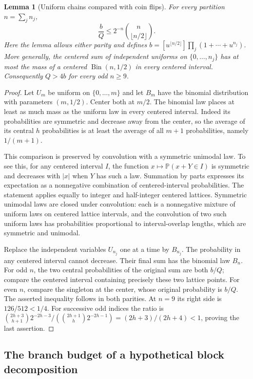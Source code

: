 \documentclass[11pt,a4paper]{article}
\newtheorem{lemma}[theorem]{Lemma}
\theoremstyle{definition}
\theoremstyle{remark}
\numberwithin{equation}{section}
\begin{document}
\begin{lemma}[Uniform chains compared with coin flips]\label{p7:gn:concentration}
For every partition $n=\sum_j n_j$,
\[
 \frac bQ\le 2^{-n}\binom n{\lfloor n/2\rfloor}.
\]
Here the lemma allows either parity and defines
$b=[u^{\lfloor n/2\rfloor}]\prod_j(1+\cdots+u^{n_j})$.
More generally, the centered sum of independent uniforms on
$\{0,\ldots,n_j\}$ has at most the mass of a centered
$\operatorname{Bin}(n,1/2)$ in every centered interval.
Consequently $Q>4b$ for every odd $n\ge9$.
\end{lemma}
\begin{proof}
Let $U_m$ be uniform on $\{0,\ldots,m\}$ and let $B_m$ have
the binomial distribution with parameters $(m,1/2)$. Center both
at $m/2$. The binomial law places at least as much mass as the
uniform law in every centered interval. Indeed its probabilities
are symmetric and decrease away from the center, so the average
of its central $h$ probabilities is at least the average of all
$m+1$ probabilities, namely $1/(m+1)$.

This comparison is preserved by convolution with a symmetric
unimodal law. To see this, for any centered interval $I$, the
function $x\mapsto\mathbb P(x+Y\in I)$ is symmetric and decreases
with $|x|$ when $Y$ has such a law. Summation by parts expresses
its expectation as a nonnegative combination of centered-interval
probabilities. The statement applies equally to integer and
half-integer centered lattices. Symmetric unimodal laws are closed
under convolution: each is a nonnegative mixture of uniform laws
on centered lattice intervals, and the convolution of two such
uniform laws has probabilities proportional to interval-overlap
lengths, which are symmetric and unimodal.

Replace the independent variables $U_{n_j}$ one at a time by
$B_{n_j}$. The probability in any centered interval cannot decrease.
Their final sum has the binomial law $B_n$. For odd $n$, the two
central probabilities of the original sum are both $b/Q$; compare
the centered interval containing precisely these two lattice points.
For even $n$, compare the singleton at the center, whose original
probability is $b/Q$. The asserted inequality follows in both
parities. At $n=9$ its right side is
$126/512<1/4$. For successive odd indices the ratio is
$\binom{2h+3}{h+1}2^{-2h-3}/(\binom{2h+1}{h}2^{-2h-1})
=(2h+3)/(2h+4)<1$, proving the last assertion.
\end{proof}

\subsection{The branch budget of a hypothetical block decomposition}
\end{document}
